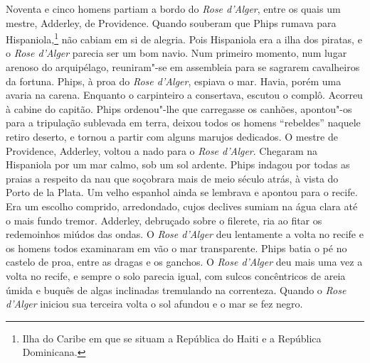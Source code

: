 Noventa e cinco homens partiam a bordo do \textit{Rose d’Alger}, entre os
quais um mestre, Adderley, de Providence. Quando souberam que Phips rumava
para Hispaniola,\footnote{ Ilha do Caribe em que se situam a República do
Haiti e a República Dominicana.} não cabiam em si de alegria.
Pois Hispaniola era a ilha dos piratas, e o \textit{Rose d’Alger} parecia
ser um bom navio. Num primeiro momento, num lugar arenoso do arquipélago,
reuniram"-se em assembleia para se sagrarem cavalheiros da fortuna. Phips,
à proa do \textit{Rose d’Alger}, espiava o mar. Havia, porém uma avaria na
carena. Enquanto o carpinteiro a consertava, escutou o complô. Acorreu à
cabine do capitão. Phips ordenou"-lhe que carregasse os canhões, apontou"-os
para a tripulação sublevada em terra, deixou todos os homens “rebeldes”
naquele retiro deserto, e tornou a partir com alguns marujos dedicados. O
mestre de Providence, Adderley, voltou a nado para o \textit{Rose
d’Alger}. Chegaram na Hispaniola por um mar calmo, sob um sol ardente.
Phips indagou por todas as praias a respeito da nau que soçobrara mais de
meio século atrás, à vista do Porto de la Plata. Um velho espanhol ainda
se lembrava e apontou para o recife. Era um escolho comprido, arredondado,
cujos declives sumiam na água clara até o mais fundo tremor. Adderley,
debruçado sobre o filerete, ria ao fitar os redemoinhos miúdos das ondas.
O \textit{Rose d’Alger} deu lentamente a volta no recife e os homens todos
examinaram em vão o mar transparente. Phips batia o pé no castelo de proa,
entre as dragas e os ganchos. O \textit{Rose d’Alger} deu mais uma vez a
volta no recife, e sempre o solo parecia igual, com sulcos concêntricos de
areia úmida e buquês de algas inclinadas tremulando na correnteza. Quando
o \textit{Rose d’Alger} iniciou sua terceira volta o sol afundou e o mar
se fez negro.

